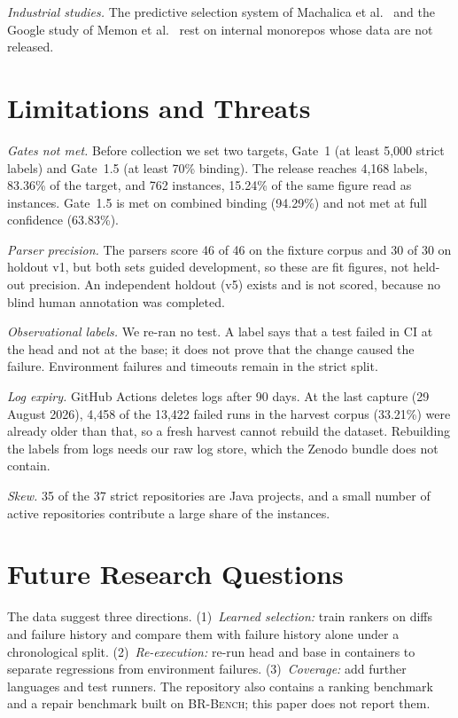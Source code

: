 \documentclass[10pt,conference]{IEEEtran}
\begin{document}
\textit{Industrial studies.} The predictive selection system of Machalica et al.~\cite{machalica2019predictive} and the Google study of Memon et al.~\cite{memon2017taming} rest on internal monorepos whose data are not released.

\section{Limitations and Threats}
\label{sec:limits}

\textit{Gates not met.} Before collection we set two targets, Gate~1 (at least 5,000 strict labels) and Gate~1.5 (at least 70\% binding). The release reaches 4,168 labels, 83.36\% of the target, and 762 instances, 15.24\% of the same figure read as instances. Gate~1.5 is met on combined binding (94.29\%) and not met at full confidence (63.83\%).

\textit{Parser precision.} The parsers score 46 of 46 on the fixture corpus and 30 of 30 on holdout v1, but both sets guided development, so these are fit figures, not held-out precision. An independent holdout (v5) exists and is not scored, because no blind human annotation was completed.

\textit{Observational labels.} We re-ran no test. A label says that a test failed in CI at the head and not at the base; it does not prove that the change caused the failure. Environment failures and timeouts remain in the strict split.

\textit{Log expiry.} GitHub Actions deletes logs after 90 days. At the last capture (29 August 2026), 4,458 of the 13,422 failed runs in the harvest corpus (33.21\%) were already older than that, so a fresh harvest cannot rebuild the dataset. Rebuilding the labels from logs needs our raw log store, which the Zenodo bundle does not contain.

\textit{Skew.} 35 of the 37 strict repositories are Java projects, and a small number of active repositories contribute a large share of the instances.

\section{Future Research Questions}

The data suggest three directions. (1)~\textit{Learned selection:} train rankers on diffs and failure history and compare them with failure history alone under a chronological split. (2)~\textit{Re-execution:} re-run head and base in containers to separate regressions from environment failures. (3)~\textit{Coverage:} add further languages and test runners. The repository also contains a ranking benchmark and a repair benchmark built on \textsc{BR-Bench}; this paper does not report them.
\end{document}
